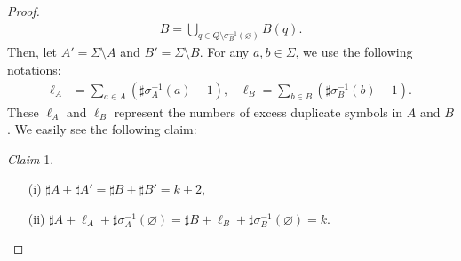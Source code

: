 \begin{proof}
\begin{align*}
  B = \bigcup_{q \in Q \setminus \sigma_{B}^{-1}(\varnothing)} B(q).
\end{align*}
Then, let $A' = \Sigma \setminus A$ and $B' = \Sigma \setminus B$.
For any $a,b \in \Sigma$, we use the following notations:
\begin{align*}
  \ell_{A} &= \sum_{a \in A}(\sharp \sigma_{A}^{-1}(a) - 1) \mbox{,~~~}
  \ell_{B} = \sum_{b \in B}(\sharp \sigma_{B}^{-1}(b) - 1).
\end{align*}
These $\ell_{A}$ and $\ell_{B}$ represent the numbers of excess duplicate symbols in $A$ and $B$.
We easily see the following claim:  

\smallskip

\noindent
\textit{Claim} 1. 
\begin{enumerate}
  \item[(i)] $\sharp A + \sharp A' = \sharp B + \sharp B' = k + 2$,
  \item[(ii)] $\sharp A + \ell_{A} + \sharp \sigma_{A}^{-1}(\varnothing) = \sharp B + \ell_{B} + \sharp \sigma_{B}^{-1}(\varnothing) = k$.
\end{enumerate}

\smallskip


\end{proof}
